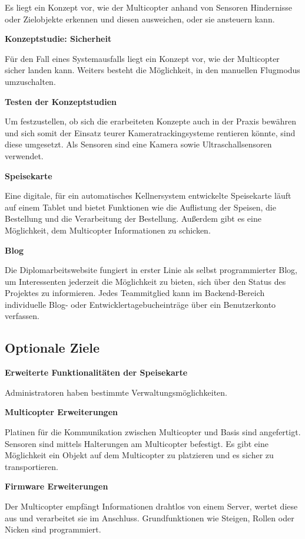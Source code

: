   Es liegt ein Konzept vor, wie der Multicopter anhand von Sensoren Hindernisse oder Zielobjekte
  erkennen und diesen ausweichen, oder sie ansteuern kann.

  \textbf{Konzeptstudie: Sicherheit}

  Für den Fall eines Systemausfalls liegt ein Konzept vor, wie der Multicopter sicher landen kann.
  Weiters besteht die Möglichkeit, in den manuellen Flugmodus umzuschalten.

  \textbf{Testen der Konzeptstudien}

  Um festzustellen, ob sich die erarbeiteten Konzepte auch in der Praxis bewähren und sich somit der Einsatz teurer Kameratrackingsysteme rentieren könnte, sind diese umgesetzt.
  Als Sensoren sind eine Kamera sowie Ultraschallsensoren verwendet.

  \textbf{Speisekarte}

  Eine digitale, für ein automatisches Kellnersystem entwickelte Speisekarte läuft auf einem Tablet
  und bietet Funktionen wie die Auflistung der Speisen, die Bestellung und die Verarbeitung der Bestellung.
  Außerdem gibt es eine Möglichkeit, dem Multicopter Informationen zu schicken.

  \textbf{Blog}

  Die Diplomarbeitswebsite fungiert in erster Linie als selbst programmierter Blog, um Interessenten
  jederzeit die Möglichkeit zu bieten, sich über den Status des Projektes zu informieren. Jedes Teammitglied
  kann im Backend-Bereich individuelle Blog- oder Entwicklertagebucheinträge über ein Benutzerkonto verfassen.

  \subsection{Optionale Ziele}
  \textbf{Erweiterte Funktionalitäten der Speisekarte}

  Administratoren haben bestimmte Verwaltungsmöglichkeiten.

  \textbf{Multicopter Erweiterungen}

  Platinen für die Kommunikation zwischen Multicopter und Basis sind angefertigt.
  Sensoren sind mittels Halterungen am Multicopter befestigt.
  Es gibt eine Möglichkeit ein Objekt auf dem Multicopter zu platzieren und es sicher zu transportieren.

  \textbf{Firmware Erweiterungen}

  Der Multicopter empfängt Informationen drahtlos von einem Server,
  wertet diese aus und verarbeitet sie im Anschluss.
  Grundfunktionen wie Steigen, Rollen oder Nicken sind programmiert.

